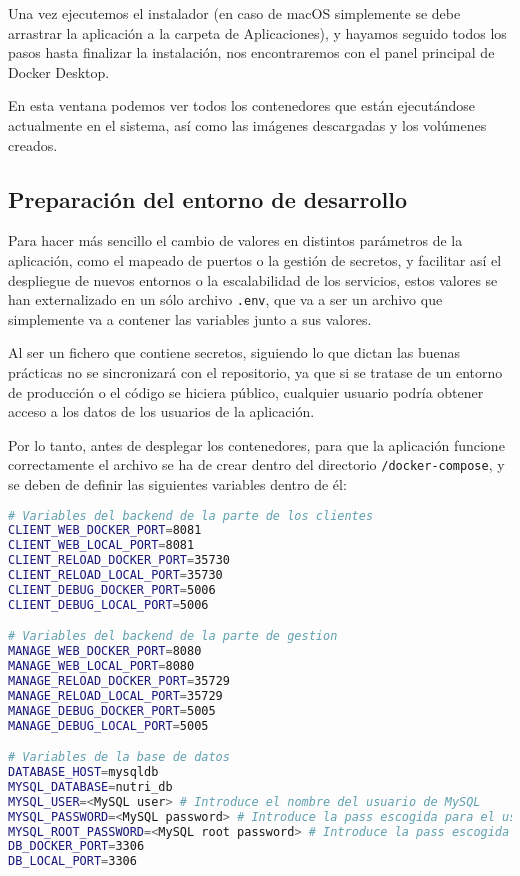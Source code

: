 
Una vez ejecutemos el instalador (en caso de macOS simplemente se debe arrastrar la aplicación a la carpeta de Aplicaciones), y hayamos seguido todos los pasos hasta finalizar la instalación, nos encontraremos con el panel principal de Docker Desktop. 


En esta ventana podemos ver todos los contenedores que están ejecutándose actualmente en el sistema, así como las imágenes descargadas y los volúmenes creados.

\subsection{Preparación del entorno de desarrollo} \label{entorno-desarrollo}

Para hacer más sencillo el cambio de valores en distintos parámetros de la aplicación, como el mapeado de puertos o la gestión de secretos, y facilitar así el despliegue de nuevos entornos o la escalabilidad de los servicios, estos valores se han externalizado en un sólo archivo \verb,.env,, que va a ser un archivo que simplemente va a contener las variables junto a sus valores. 

Al ser un fichero que contiene secretos, siguiendo lo que dictan las buenas prácticas no se sincronizará con el repositorio, ya que si se tratase de un entorno de producción o el código se hiciera público, cualquier usuario podría obtener acceso a los datos de los usuarios de la aplicación.

Por lo tanto, antes de desplegar los contenedores, para que la aplicación funcione correctamente el archivo se ha de crear dentro del directorio \verb,/docker-compose,, y se deben de definir las siguientes variables dentro de él:

\begin{lstlisting}[language=Bash]
# Variables del backend de la parte de los clientes
CLIENT_WEB_DOCKER_PORT=8081
CLIENT_WEB_LOCAL_PORT=8081
CLIENT_RELOAD_DOCKER_PORT=35730
CLIENT_RELOAD_LOCAL_PORT=35730
CLIENT_DEBUG_DOCKER_PORT=5006
CLIENT_DEBUG_LOCAL_PORT=5006

# Variables del backend de la parte de gestion
MANAGE_WEB_DOCKER_PORT=8080
MANAGE_WEB_LOCAL_PORT=8080
MANAGE_RELOAD_DOCKER_PORT=35729
MANAGE_RELOAD_LOCAL_PORT=35729
MANAGE_DEBUG_DOCKER_PORT=5005
MANAGE_DEBUG_LOCAL_PORT=5005

# Variables de la base de datos
DATABASE_HOST=mysqldb
MYSQL_DATABASE=nutri_db
MYSQL_USER=<MySQL user> # Introduce el nombre del usuario de MySQL
MYSQL_PASSWORD=<MySQL password> # Introduce la pass escogida para el usuario creado en el paso anterior
MYSQL_ROOT_PASSWORD=<MySQL root password> # Introduce la pass escogida para el usuario root de MySQL
DB_DOCKER_PORT=3306
DB_LOCAL_PORT=3306
\end{lstlisting}

